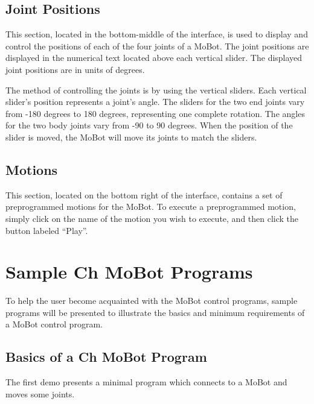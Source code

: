 \documentclass{article}
\begin{document}
\subsection{Joint Positions}
This section, located in the bottom-middle of the interface, is used to display
and control the positions of each of the four
joints of a MoBot. The joint positions are displayed in the numerical
text located above each vertical slider. The displayed joint positions are in
units of degrees.  

The method of controlling the joints is by using the vertical sliders.
Each vertical slider's position represents a joint's angle. The sliders for the
two end joints vary from -180 degrees to 180 degrees, representing one complete
rotation. The angles for the two body joints vary from -90 to 90 degrees. When
the position of the slider is moved, the MoBot will move its joints to match the 
sliders. 

\subsection{Motions}
This section, located on the bottom right of the interface, contains a set of
preprogrammed motions for the MoBot. To execute a preprogrammed motion, simply
click on the name of the motion you wish to execute, and then click the button
labeled ``Play''.

\section{Sample Ch MoBot Programs}
To help the user become acquainted with the MoBot control programs, sample
programs will be presented to illustrate the basics and minimum requirements of
a MoBot control program. 

\subsection{Basics of a Ch MoBot Program}
The first demo presents a minimal program which connects to a MoBot and
moves some joints.
\end{document}

